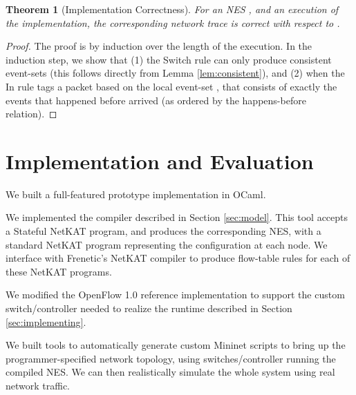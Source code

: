 \documentclass[pldi-cameraready]{sigplanconf}
\newtheorem{theorem}{Theorem}
\begin{document}
\begin{theorem}[Implementation Correctness]
\label{thm:correct}
For an NES , and an execution
 of the implementation,
the corresponding network trace  is correct with respect to .
\end{theorem}
\begin{proof}
The proof is by induction over the length  of the execution.  In
the induction step, we show that (1) the {\sc Switch} rule can only
produce consistent event-sets (this follows directly from Lemma
\ref{lem:consistent}), and (2) when the {\sc In} rule tags a packet
 based on the local event-set , that  consists of exactly
the events that happened before  arrived (as ordered by the
happens-before relation).
\end{proof}



\renewcommand*{\proofname}{Proof}


\section{Implementation and Evaluation}
\label{sec:eval}

We built a full-featured prototype implementation in OCaml.
\begin{compactitem}
\item We implemented the compiler described in Section \ref{sec:model}. This tool
accepts a Stateful NetKAT program, and produces the corresponding NES, with a standard
NetKAT program representing the configuration at each node.
We interface with Frenetic's NetKAT compiler to produce flow-table rules for each of these NetKAT programs.
\item We modified the OpenFlow 1.0 reference implementation to support the custom switch/controller needed to realize the runtime described
in Section \ref{sec:implementing}.
\item We built tools to automatically generate custom Mininet
scripts
to bring up the programmer-specified network topology, using switches/controller running
the compiled NES. We can then realistically simulate the whole system
using real network traffic.
\end{compactitem}
\end{document}

